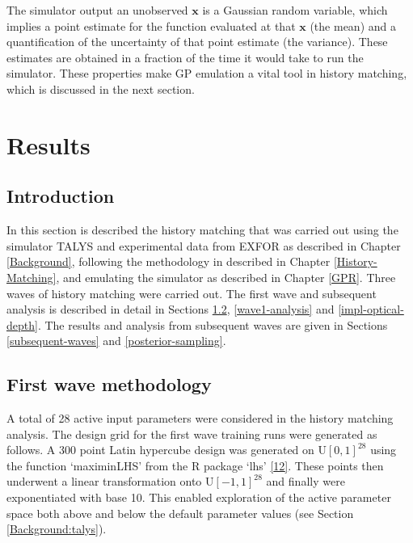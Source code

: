 \documentclass[
  12pt,
  a4paper,
  twoside]{book}
\begin{document}
The simulator output an unobserved \(\mathbf{x}\) is a Gaussian random variable, which implies a point estimate for the function evaluated at that \(\mathbf{x}\) (the mean) and a quantification of the uncertainty of that point estimate (the variance). These estimates are obtained in a fraction of the time it would take to run the simulator. These properties make GP emulation a vital tool in history matching, which is discussed in the next section.

\hypertarget{results}{%
\chapter{Results}\label{results}}

\hypertarget{introduction-3}{%
\section{Introduction}\label{introduction-3}}

In this section is described the history matching that was carried out using the simulator TALYS and experimental data from EXFOR as described in Chapter \ref{Background}, following the methodology in described in Chapter \ref{History-Matching}, and emulating the simulator as described in Chapter \ref{GPR}. Three waves of history matching were carried out. The first wave and subsequent analysis is described in detail in Sections \ref{wave1-methodology}, \ref{wave1-analysis} and \ref{impl-optical-depth}. The results and analysis from subsequent waves are given in Sections \ref{subsequent-waves} and \ref{posterior-sampling}.

\hypertarget{wave1-methodology}{%
\section{First wave methodology}\label{wave1-methodology}}

A total of 28 active input parameters were considered in the history matching analysis. The design grid for the first wave training runs were generated as follows. A 300 point Latin hypercube design was generated on U\([0,1]^{28}\) using the function `maximinLHS' from the R package `lhs' \protect\hyperlink{ref-lhs_r}{{[}12{]}}. These points then underwent a linear transformation onto U\([-1,1]^{28}\) and finally were exponentiated with base 10. This enabled exploration of the active parameter space both above and below the default parameter values (see Section \ref{Background:talys}).
\end{document}

